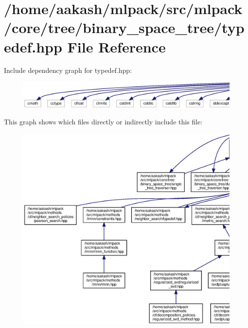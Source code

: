 \section{/home/aakash/mlpack/src/mlpack/core/tree/binary\+\_\+space\+\_\+tree/typedef.hpp File Reference}
\label{core_2tree_2binary__space__tree_2typedef_8hpp}
Include dependency graph for typedef.\+hpp\+:
\nopagebreak
\begin{figure}[H]
\begin{center}
\leavevmode
\includegraphics[width=350pt]{core_2tree_2binary__space__tree_2typedef_8hpp__incl}
\end{center}
\end{figure}
This graph shows which files directly or indirectly include this file\+:
\nopagebreak
\begin{figure}[H]
\begin{center}
\leavevmode
\includegraphics[width=350pt]{core_2tree_2binary__space__tree_2typedef_8hpp__dep__incl}
\end{center}
\end{figure}
